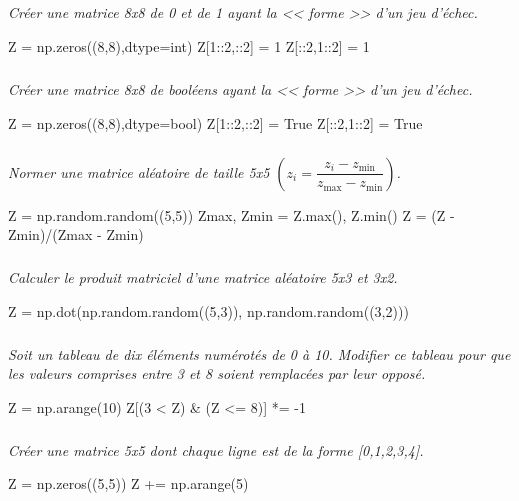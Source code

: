 \documentclass[10pt,fleqn]{article} %
\begin{document}
\begin{multicols}{2}
\subparagraph{}\textit{Créer une matrice 8x8 de 0 et de 1 ayant la << forme >> d'un jeu d'échec. }
\ifprof
\begin{corrige}
\begin{python}
Z = np.zeros((8,8),dtype=int)
Z[1::2,::2] = 1
Z[::2,1::2] = 1 
\end{python}
\end{corrige}
\else
\fi


\subparagraph{}\textit{Créer une matrice 8x8 de booléens ayant la << forme >> d'un jeu d'échec. }
\ifprof
\begin{corrige}
\begin{python}
Z = np.zeros((8,8),dtype=bool)
Z[1::2,::2] = True
Z[::2,1::2] = True
\end{python}
\end{corrige}
\else
\fi


\subparagraph{}\textit{Normer une matrice aléatoire de taille 5x5 $\left(z_i = \dfrac{z_i-z_{\text{min}}}{z_{\text{max}}-z_{\text{min}}}\right)$.}
\ifprof
\begin{corrige}
\begin{python}
Z = np.random.random((5,5))
Zmax, Zmin = Z.max(), Z.min()
Z = (Z - Zmin)/(Zmax - Zmin)
\end{python}
\end{corrige}
\else
\fi


\subparagraph{}\textit{Calculer le produit matriciel d'une matrice aléatoire 5x3 et 3x2.}
\ifprof
\begin{corrige}
\begin{python}
Z = np.dot(np.random.random((5,3)), np.random.random((3,2)))
\end{python}
\end{corrige}
\else
\fi


\subparagraph{}\textit{Soit un tableau de dix éléments numérotés de 0 à 10. Modifier ce tableau pour que les valeurs comprises entre 3 et 8 soient remplacées par leur opposé.}
\ifprof
\begin{corrige}
\begin{python}
Z = np.arange(10)
Z[(3 < Z) & (Z <= 8)] *= -1
\end{python}
\end{corrige}
\else
\fi


\subparagraph{}\textit{Créer une matrice 5x5 dont chaque ligne est de la forme [0,1,2,3,4].}
\ifprof
\begin{corrige}
\begin{python}
Z = np.zeros((5,5))
Z += np.arange(5)
\end{python}
\end{corrige}
\else
\fi



\end{multicols}
\end{document}
